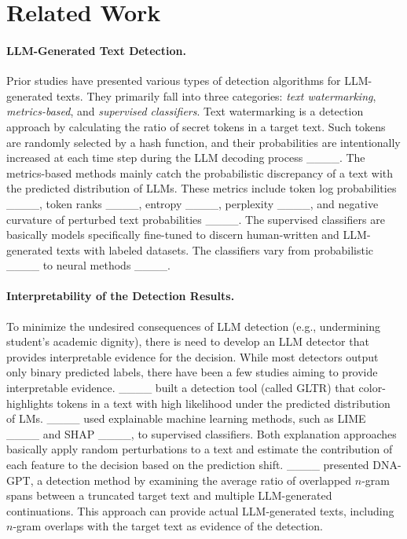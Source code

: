 \section{Related Work}
\paragraph{LLM-Generated Text Detection.} 
Prior studies have presented various types of detection algorithms for LLM-generated texts.
They primarily fall into three categories: \emph{text watermarking}, \emph{metrics-based}, and \emph{supervised classifiers}.
Text watermarking is a detection approach by calculating the ratio of secret tokens in a target text.
Such tokens are randomly selected by a hash function, and their probabilities are intentionally increased at each time step during the LLM decoding process ____.
The metrics-based methods mainly catch the probabilistic discrepancy of a text with the predicted distribution of LLMs.
These metrics include token log probabilities ____, token ranks ____, entropy ____, perplexity ____, and negative curvature of perturbed text probabilities ____.
The supervised classifiers are basically models specifically fine-tuned to discern human-written and LLM-generated texts with labeled datasets. The classifiers vary from probabilistic ____ to neural methods ____. 


\paragraph{Interpretability of the Detection Results.}
\label{interpretable_detectors}
To minimize the undesired consequences of LLM detection (e.g., undermining student's academic dignity), there is need to develop an LLM detector that provides interpretable evidence for the decision. 
While most detectors output only binary predicted labels, there have been a few studies aiming to provide interpretable evidence.
____ built a detection tool (called GLTR) that color-highlights tokens in a text with high likelihood under the predicted distribution of LMs. 
____ used explainable machine learning methods, such as LIME ____ and SHAP ____, to supervised classifiers. Both explanation approaches basically apply random perturbations to a text and estimate the contribution of each feature to the decision based on the prediction shift. 
____ presented DNA-GPT, a detection method by examining the average ratio of overlapped $n$-gram spans between a truncated target text and multiple LLM-generated continuations.
This approach can provide actual LLM-generated texts, including $n$-gram overlaps with the target text as evidence of the detection.

